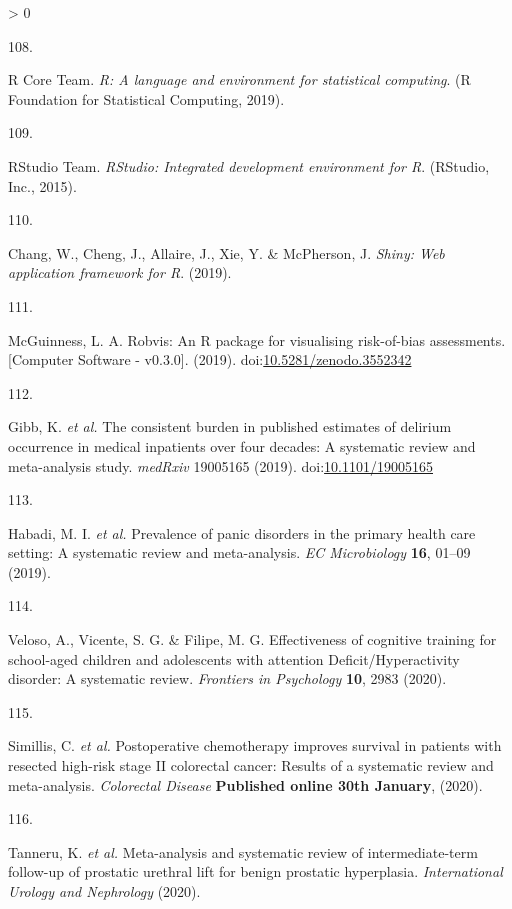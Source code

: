 \documentclass[a4paper, twoside]{templates/ociamthesis}
\newlength{\cslhangindent}
\newlength{\csllabelwidth}
\newenvironment{CSLReferences}[3] %
 {%
  \setlength{\parindent}{0pt}
  \ifodd #1 \everypar{\setlength{\hangindent}{\cslhangindent}}\ignorespaces\fi
  \ifnum #2 > 0
  \setlength{\parskip}{#2\baselineskip}
  \fi
 }%
 {}
\newcommand{\CSLLeftMargin}[1]{\parbox[t]{\maxof{\widthof{#1}}{\csllabelwidth}}{#1}}
\newcommand{\CSLRightInline}[1]{\parbox[t]{\linewidth - \csllabelwidth}{#1}}
\begin{document}
\begin{CSLReferences}{0}{0}
\leavevmode\hypertarget{ref-rref}{}%
\CSLLeftMargin{108. }
\CSLRightInline{R Core Team. \emph{R: {A} language and environment for statistical computing}. ({R Foundation for Statistical Computing}, 2019).}

\leavevmode\hypertarget{ref-rstudioref}{}%
\CSLLeftMargin{109. }
\CSLRightInline{RStudio Team. \emph{{RStudio}: {Integrated} development environment for {R}}. ({RStudio, Inc.}, 2015).}

\leavevmode\hypertarget{ref-shinyref}{}%
\CSLLeftMargin{110. }
\CSLRightInline{Chang, W., Cheng, J., Allaire, J., Xie, Y. \& McPherson, J. \emph{Shiny: {Web} application framework for {R}}. (2019).}

\leavevmode\hypertarget{ref-mcguinness2019a}{}%
\CSLLeftMargin{111. }
\CSLRightInline{McGuinness, L. A. Robvis: {An R} package for visualising risk-of-bias assessments. {[}{Computer Software} - v0.3.0{]}. (2019). doi:\href{https://doi.org/10.5281/zenodo.3552342}{10.5281/zenodo.3552342}}

\leavevmode\hypertarget{ref-gibb2019consistent}{}%
\CSLLeftMargin{112. }
\CSLRightInline{Gibb, K. \emph{et al.} The consistent burden in published estimates of delirium occurrence in medical inpatients over four decades: A systematic review and meta-analysis study. \emph{medRxiv} 19005165 (2019). doi:\href{https://doi.org/10.1101/19005165}{10.1101/19005165}}

\leavevmode\hypertarget{ref-habadi2019prevalence}{}%
\CSLLeftMargin{113. }
\CSLRightInline{Habadi, M. I. \emph{et al.} Prevalence of panic disorders in the primary health care setting: {A} systematic review and meta-analysis. \emph{EC Microbiology} \textbf{16}, 01--09 (2019).}

\leavevmode\hypertarget{ref-veloso2020effectiveness}{}%
\CSLLeftMargin{114. }
\CSLRightInline{Veloso, A., Vicente, S. G. \& Filipe, M. G. Effectiveness of cognitive training for school-aged children and adolescents with attention {Deficit}/{Hyperactivity} disorder: {A} systematic review. \emph{Frontiers in Psychology} \textbf{10}, 2983 (2020).}

\leavevmode\hypertarget{ref-simillis2020}{}%
\CSLLeftMargin{115. }
\CSLRightInline{Simillis, C. \emph{et al.} Postoperative chemotherapy improves survival in patients with resected high-risk stage {II} colorectal cancer: Results of a systematic review and meta-analysis. \emph{Colorectal Disease} \textbf{Published online 30th January}, (2020).}

\leavevmode\hypertarget{ref-tanneru2020}{}%
\CSLLeftMargin{116. }
\CSLRightInline{Tanneru, K. \emph{et al.} Meta-analysis and systematic review of intermediate-term follow-up of prostatic urethral lift for benign prostatic hyperplasia. \emph{International Urology and Nephrology} (2020).}


\end{CSLReferences}
\end{document}
